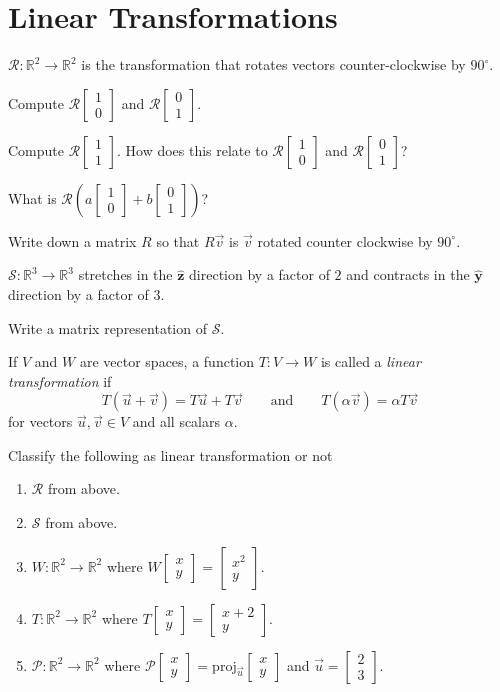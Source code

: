 \documentclass{problemset}
\newcommand{\yh}{{\hat {\mathbf y}}}
\newcommand{\zh}{{\hat {\mathbf z}}}
\newcommand{\R}{\mathbb{R}}
\newcommand{\proj}{\mathrm{proj}}
\newcommand{\mat}[1]{\begin{bmatrix}#1\end{bmatrix}}
\begin{document}
\newpage
\section*{Linear Transformations}
\vspace{-1.5em}
	
	\question
	$\mathcal R:\R^2\to\R^2$ is the transformation that rotates vectors counter-clockwise 
	by $90^\circ$.
	\begin{parts}
		\item Compute $\mathcal R\mat{1\\0}$ and $\mathcal R\mat{0\\1}$.
		\item Compute $\mathcal R\mat{1\\1}$.  How does this relate to
			$\mathcal R\mat{1\\0}$ and $\mathcal R\mat{0\\1}$?
		\item What is $\mathcal R\left(a\mat{1\\0}+b\mat{0\\1}\right)$?
		\item Write down a matrix $R$ so that $R\vec v$ is $\vec v$ rotated
			counter clockwise by $90^\circ$.
	\end{parts}

	\question
	$\mathcal S:\R^3\to\R^3$ stretches in the $\zh$ direction  by a factor of $2$
	and contracts in the $\yh$ direction by a factor of $3$.
	\begin{parts}
		\item Write a matrix representation of $\mathcal S$.
	\end{parts}

	\begin{definition}
		If $V$ and $W$ are vector spaces, a function $T:V\to W$ is called a \emph{linear transformation}
		if 
		\[
			T(\vec u+\vec v)=T\vec u+T\vec v \qquad\text{and}\qquad
			T(\alpha \vec v)=\alpha T\vec v
		\]
		for vectors $\vec u,\vec v\in V$ and all scalars $\alpha$.
	\end{definition}

	\question
	\begin{parts}
		\item Classify the following as linear transformation or not
			\begin{enumerate}
				\item $\mathcal R$ from above.
				\item $\mathcal S$ from above.
				\item $W:\R^2\to\R^2$ where $W\mat{x\\y}=\mat{x^2\\y}$.
				\item $T:\R^2\to\R^2$ where $T\mat{x\\y}=\mat{x+2\\y}$.
				\item $\mathcal P:\R^2\to\R^2$ where $\mathcal P\mat{x\\y}=\proj_{\vec u}\mat{x\\y}$ and 
					$\vec u=\mat{2\\3}$.
			\end{enumerate}
	\end{parts}
\end{document}
